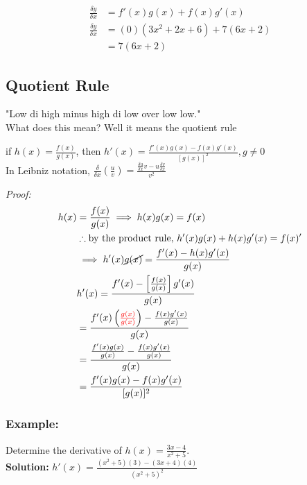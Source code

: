 \documentclass{article}
\begin{document}
\begin{align}
    \frac{\delta y}{\delta x}&=f'(x)g(x)+f(x)g'(x)\\
    \frac{\delta y}{\delta x}&=(0)(3x^2+2x+6)+7(6x+2)\\
    &=7(6x+2)
\end{align}

\subsection{Quotient Rule}
"Low di high minus high di low over low low." \\
What does this mean? Well it means the quotient rule

\begin{tcolorbox}[colback=blue!5!snow, colframe=white!50!white,
  colbacktitle=blue!75!mistyrose, title=Quotient Rule]
if $h(x)=\frac{f(x)}{g(x)}$, then $h'(x)=\frac{f'(x)g(x)-f(x)g'(x)}{[g(x)]^2}, g \neq 0$\\
In Leibniz notation, $\frac{\delta }{\delta x}(\frac{u}{v})=\frac{\frac{\delta u}{\delta x}v- u\frac{\delta v}{\delta x}}{v^2}$
\end{tcolorbox}
\textit{Proof:}
\begin{align*}
    h(x)&=\frac{f(x)}{g(x)} \implies h(x)g(x)=f(x)\\
    & \therefore \text{by the product rule, } h'(x)g(x)+h(x)g'(x)=f(x)'\\
    &\implies h'(x)\cancel{g(x)}=\frac{f'(x)-h(x)g'(x)}{g(x)}\\
    &h'(x)=\frac{f'(x)-\left[\frac{f(x)}{g(x)}\right]g'(x)}{g(x)}\\
    &=\frac{f'(x)\left( \textcolor{red}{\frac{g(x)}{g(x)}}\right)-\frac{f(x)g'(x)}{g(x)}}{g(x)}\\
    &=\frac{\frac{f'(x)g(x)}{g(x)}-\frac{f(x)g'(x)}{g(x)}}{g(x)}\\
    &=\frac{f'(x)g(x)-f(x)g'(x)}{[g(x)]^2}
\end{align*}
\subsubsection*{Example:}
Determine the derivative of $h(x)=\frac{3x-4}{x^2+5}$.\\
\textbf{Solution:}
$h'(x)=\frac{(x^2+5)(3)-(3x+4)(4)}{(x^2+5)^ 2}$
\newpage 
\end{document}
